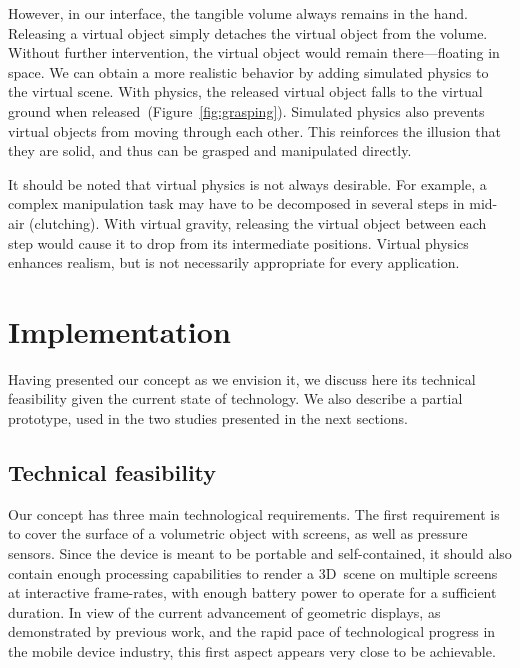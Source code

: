 \documentclass{vgtc}                         \havecopyrightspacefalse
\begin{document}
However, in our interface, the tangible volume always remains in the hand. Releasing a virtual object simply detaches the virtual object from the volume. Without further intervention, the virtual object would remain there---floating in space. We can obtain a more realistic behavior by adding simulated physics to the virtual scene. With physics, the released virtual object falls to the virtual ground when released~(Figure~\ref{fig:grasping}). Simulated physics also prevents virtual objects from moving through each other. This reinforces the illusion that they are solid, and thus can be grasped and manipulated directly.

It should be noted that virtual physics is not always desirable. For example, a complex manipulation task may have to be decomposed in several steps in mid-air (clutching). With virtual gravity, releasing the virtual object between each step would cause it to drop from its intermediate positions. Virtual physics enhances realism, but is not necessarily appropriate for every application.

\section{Implementation}

Having presented our concept as we envision it, we discuss here its technical feasibility given the current state of technology. We also describe a partial prototype, used in the two studies presented in the next sections.

\subsection{Technical feasibility}

Our concept has three main technological requirements. The first requirement is to cover the surface of a volumetric object with screens, as well as pressure sensors. Since the device is meant to be portable and self-contained, it should also contain enough processing capabilities to render a 3D~scene on multiple screens at interactive frame-rates, with enough battery power to operate for a sufficient duration. In view of the current advancement of geometric displays, as demonstrated by previous work, and the rapid pace of technological progress in the mobile device industry, this first aspect appears very close to be achievable.
\end{document}
